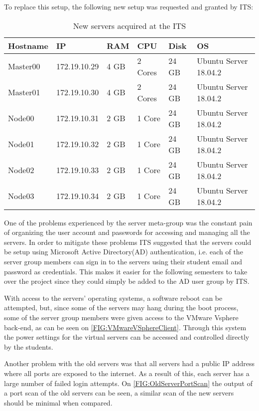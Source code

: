 To replace this setup, the following new setup was requested and granted by ITS:

\begin{table}[H]
\begin{tabular}{|l|l|l|l|l|l|}
\hline
Hostname 	& IP			& RAM 	& CPU 		& Disk 		& OS 						\\ \hline
Master00 	& 172.19.10.29	& 4 GB	& 2 Cores	& 24 GB		& Ubuntu Server 18.04.2		\\ \hline
Master01 	& 172.19.10.30	& 4 GB	& 2 Cores	& 24 GB		& Ubuntu Server 18.04.2		\\ \hline
Node00 		& 172.19.10.31	& 2 GB	& 1 Core	& 24 GB		& Ubuntu Server 18.04.2		\\ \hline
Node01 		& 172.19.10.32	& 2 GB	& 1 Core	& 24 GB		& Ubuntu Server 18.04.2		\\ \hline
Node02 		& 172.19.10.33	& 2 GB	& 1 Core	& 24 GB		& Ubuntu Server 18.04.2		\\ \hline
Node03 		& 172.19.10.34	& 2 GB	& 1 Core	& 24 GB		& Ubuntu Server 18.04.2		\\ \hline
\end{tabular}
\caption{New servers acquired at the ITS}
\end{table}

One of the problems experienced by the server meta-group was the constant pain of organizing the user account and passwords for accessing and managing all the servers.
In order to mitigate these problems ITS suggested that the servers could be setup using Microsoft Active Directory(AD) authentication, i.e. each of the server group members can sign in to the servers using their student email and password as credentials.
This makes it easier for the following semesters to take over the project since they could simply be added to the AD user group by ITS.

With access to the servers' operating systems, a software reboot can be attempted, but, since some of the servers may hang during the boot process, some of the server group members were given access to the VMware Vsphere back-end, as can be seen on \autoref{FIG:VMwareVSphereClient}.
Through this system the power settings for the virtual servers can be accessed and controlled directly by the students.

Another problem with the old servers was that all servers had a public IP address where all ports are exposed to the internet.
As a result of this, each server has a large number of failed login attempts.
On \autoref{FIG:OldServerPortScan} the output of a port scan of the old servers can be seen, a similar scan of the new servers should be minimal when compared.

